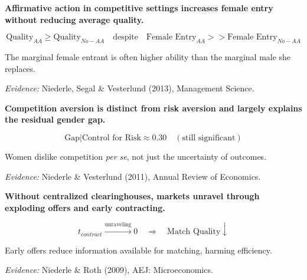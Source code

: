 \begin{tcolorbox}[colback=red!5!white,colframe=red!75!black,title=Axiom MN-3: Affirmative Action Efficacy]
\textbf{Affirmative action in competitive settings increases female entry without reducing average quality.}

\begin{equation}
\text{Quality}_{AA} \geq \text{Quality}_{No-AA} \quad \text{despite} \quad \text{Female Entry}_{AA} >> \text{Female Entry}_{No-AA}
\end{equation}

The marginal female entrant is often higher ability than the marginal male she replaces.

\textit{Evidence:} Niederle, Segal \& Vesterlund (2013), Management Science.
\end{tcolorbox}

\begin{tcolorbox}[colback=red!5!white,colframe=red!75!black,title=Axiom MN-4: Competition Aversion Independence]
\textbf{Competition aversion is distinct from risk aversion and largely explains the residual gender gap.}

\begin{equation}
\text{Gap} | \text{Control for Risk} \approx 0.30 \quad (\text{still significant})
\end{equation}

Women dislike competition \textit{per se}, not just the uncertainty of outcomes.

\textit{Evidence:} Niederle \& Vesterlund (2011), Annual Review of Economics.
\end{tcolorbox}

\begin{tcolorbox}[colback=red!5!white,colframe=red!75!black,title=Axiom MN-5: Market Unraveling]
\textbf{Without centralized clearinghouses, markets unravel through exploding offers and early contracting.}

\begin{equation}
t_{contract} \xrightarrow{\text{unraveling}} 0 \quad \Rightarrow \quad \text{Match Quality} \downarrow
\end{equation}

Early offers reduce information available for matching, harming efficiency.

\textit{Evidence:} Niederle \& Roth (2009), AEJ: Microeconomics.
\end{tcolorbox}

